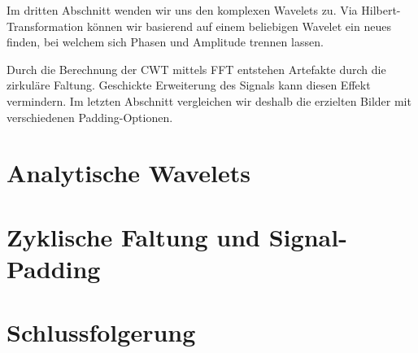 \begin{refsection}
Im dritten Abschnitt wenden wir uns den komplexen Wavelets zu.
Via Hilbert-Transformation können wir basierend auf einem beliebigen Wavelet ein neues finden, bei welchem sich Phasen und Amplitude trennen lassen.

Durch die Berechnung der CWT mittels FFT entstehen Artefakte durch die zirkuläre Faltung.
Geschickte Erweiterung des Signals kann diesen Effekt vermindern.
Im letzten Abschnitt vergleichen wir deshalb die erzielten Bilder mit verschiedenen Padding-Optionen.





\section{Analytische Wavelets}




\section{Zyklische Faltung und Signal-Padding}
\label{complex:circ-conv-padding}


\section{Schlussfolgerung}

\printbibliography[heading=subbibliography]
\end{refsection}
